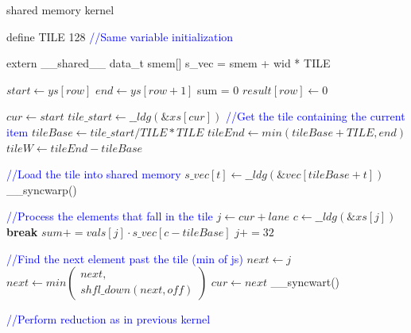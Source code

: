 \documentclass[conference]{IEEEtran}
\begin{document}
\begin{algorithm}[ht!]
    \caption{shared memory kernel}
    \begin{algorithmic}[1]
        \State define TILE 128
        \State \textcolor{blue}{//Same variable initialization}

         \Return \Comment{\textcolor{blue}{Early return}}
        \EndIf

        \State extern \_\_shared\_\_ data\_t smem[]
        \State s\_vec = smem + wid * TILE \Comment{\textcolor{blue}{Each warp gets its tile of the shared memory}}

        \State $start \gets ys[row]$
        \State $end \gets ys[row+1]$
        \State sum = 0
         \Comment{\textcolor{blue}{The row is empty}}
         $result[row] \gets 0$ \EndIf
        \EndIf

        \State $cur \gets start$ \Comment{\textcolor{blue}{index of the current element in the row being examined}}
        \State $tile\_start \gets \_\_ldg(\&xs[cur])$
        \State \textcolor{blue}{//Get the tile containing the current item}
        \State $tileBase \gets tile\_start / TILE * TILE$ \Comment{\textcolor{blue}{Exploit rounding}}
        \State $tileEnd \gets min(tileBase+TILE, end)$
        \State $tileW \gets tileEnd - tileBase$ \Comment{\textcolor{blue}{Tile width}}

        \State \textcolor{blue}{//Load the tile into shared memory}
        \State $s\_vec[t] \gets \_\_ldg(\&vec[tileBase+t])$
        \EndFor
        \State \_\_syncwarp()

        \State \textcolor{blue}{//Process the elements that fall in the tile}
        \State $j \gets cur+lane$
        \State $c \gets \_\_ldg(\&xs[j])$
         \textbf{break}
        \EndIf
        \State $sum += vals[j] \cdot s\_vec[c-tileBase]$
        \State $j += 32$
        \EndWhile

        \State \textcolor{blue}{//Find the next element past the tile (min of js)}
        \State $next \gets j$
        \State $next\gets min\left(\begin{array}{l}next,\\ shfl\_down(next, off)\end{array}\right)$
        \EndFor
        \State $cur \gets next$
        \State \_\_syncwart()
        \EndWhile

        \textcolor{blue}{//Perform reduction as in previous kernel}

        \EndProcedure
    \end{algorithmic}
    \label{algo:shared}
\end{algorithm}
\end{document}
